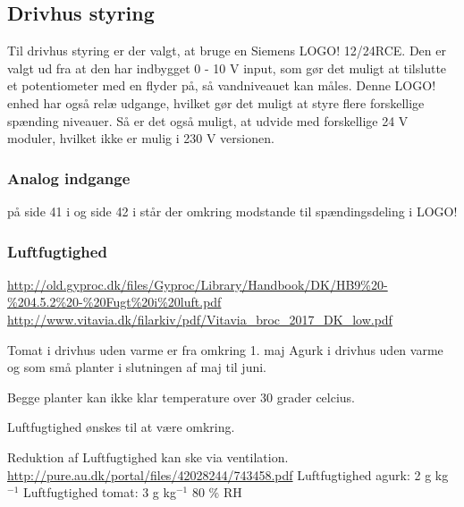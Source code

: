 \subsection{Drivhus styring}

Til drivhus styring er der valgt, at bruge en Siemens LOGO! 12/24RCE. 
Den er valgt ud fra at den har indbygget 0 - 10 V input, 
som gør det muligt at tilslutte et potentiometer med en flyder på, 
så vandniveauet kan måles.
Denne LOGO! enhed har også relæ udgange, 
hvilket gør det muligt at styre flere forskellige spænding niveauer.
Så er det også muligt, at udvide med forskellige 24 V moduler, hvilket ikke er mulig i 230 V versionen.

\subsubsection{Analog indgange}
på side 41 i \cite{logo_sm} og side 42 i \cite{logo_sm} står der omkring modstande til spændingsdeling i LOGO!

\subsubsection{Luftfugtighed}
\url{http://old.gyproc.dk/files/Gyproc/Library/Handbook/DK/HB9%20-%204.5.2%20-%20Fugt%20i%20luft.pdf}
\url{http://www.vitavia.dk/filarkiv/pdf/Vitavia_broc_2017_DK_low.pdf}

Tomat i drivhus uden varme er fra omkring 1. maj
Agurk i drivhus uden varme og som små planter i slutningen af maj til juni.

Begge planter kan ikke klar temperature over 30 grader celcius.

Luftfugtighed ønskes til at være omkring.

Reduktion af Luftfugtighed kan ske via ventilation. \url{http://pure.au.dk/portal/files/42028244/743458.pdf}
Luftfugtighed agurk: 2 g kg$^{-1}$ 
Luftfugtighed tomat: 3 g kg$^{-1}$ 
80 \% RH

